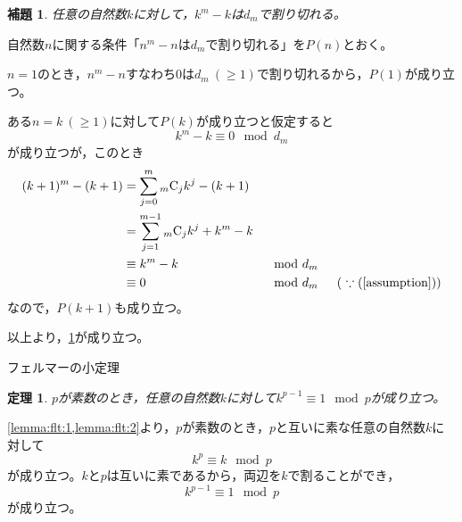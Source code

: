 \documentclass{article}
\makeatletter
\renewenvironment{proof}[1][\proofname]{\par
        \pushQED{\qed}
        \normalfont
        \topsep6\p@\@plus6\p@ \trivlist
        \item[\hskip\labelsep{\bfseries #1}\@addpunct{\bfseries}]\ignorespaces
    }{%
        \popQED\endtrivlist\@endpefalse
    }
\renewcommand{\proofname}{証明.}
\newtheorem{theorem}{定理}
\newtheorem{lemma}{補題}
\newcommand{\combination}[2]{{}_{#1} \mathrm{C}_{#2}}
\makeatother
\begin{document}
\begin{screen}
    \begin{lemma}
        \label{lemma:flt:2}
        任意の自然数$k$に対して，$k^m - k$は$d_m$で割り切れる。
    \end{lemma}
\end{screen}

\begin{proof}
    自然数$n$に関する条件「$n^m - n$は$d_m$で割り切れる」を$P(n)$とおく。

    $n = 1$のとき，$n^m - n$すなわち0は$d_m\ (\geq 1)$で割り切れるから，$P(1)$が成り立つ。

    ある$n = k\ (\geq 1)$に対して$P(k)$が成り立つと仮定すると
    \begin{equation}
        \label{assumption}
        k^m - k \equiv 0 \mod{d_m}
    \end{equation}
    が成り立つが，このとき
    \begin{alignat}{2}
        (k + 1)^m - (k + 1) &= \sum_{j = 0}^{m} \combination{m}{j} k^j - (k + 1) & & \\
                            &= \sum_{j = 1}^{m - 1} \combination{m}{j} k^j + k^m - k & & \\
                            &\equiv k^m - k & &\mod{d_m} \\
                            &\equiv 0 & &\mod{d_m} \hspace{15pt} (\ \because (\ref{assumption}) )
    \end{alignat}
    なので，$P(k + 1)$も成り立つ。

    以上より，\cref{lemma:flt:2}が成り立つ。
\end{proof}

\begin{itembox}[l]{フェルマーの小定理}
    \begin{theorem}
        \label{theorem:flt}
        $p$が素数のとき，任意の自然数$k$に対して$k^{p - 1} \equiv 1 \mod{p}$が成り立つ。
    \end{theorem}
\end{itembox}

\begin{proof}
    \cref{lemma:flt:1,lemma:flt:2}より，$p$が素数のとき，$p$と互いに素な任意の自然数$k$に対して
    \begin{equation}
        k^p \equiv k \mod{p}
    \end{equation}
    が成り立つ。$k$と$p$は互いに素であるから，両辺を$k$で割ることができ，
    \begin{equation}
        k^{p - 1} \equiv 1 \mod{p}
    \end{equation}
    が成り立つ。
\end{proof}
\end{document}
